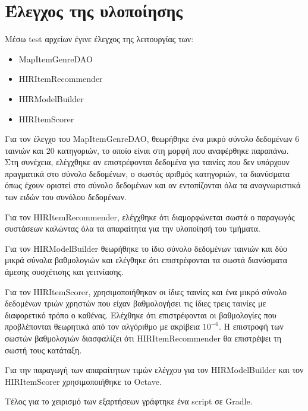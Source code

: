 \section{Έλεγχος της υλοποίησης}
Μέσω {\en test} αρχείων έγινε έλεγχος της λειτουργίας των:
\begin{itemize}
\item {\en MapItemGenreDAO}
\item {\en HIRItemRecommender}
\item {\en HIRModelBuilder}
\item {\en HIRItemScorer}
\end{itemize}\par
Για τον έλεγχο του {\en MapItemGenreDAO}, θεωρήθηκε ένα μικρό σύνολο δεδομένων 6 ταινιών και 20 κατηγοριών, το οποίο είναι στη μορφή που αναφέρθηκε παραπάνω. Στη συνέχεια, ελέγχθηκε αν επιστρέφονται δεδομένα για ταινίες που δεν υπάρχουν πραγματικά στο σύνολο δεδομένων, ο σωστός αριθμός κατηγοριών, τα διανύσματα όπως έχουν οριστεί στο σύνολο δεδομένων και αν εντοπίζονται όλα τα αναγνωριστικά των ειδών του συνόλου δεδομένων. \par
Για τον {\en HIRItemRecommender}, ελέγχθηκε ότι διαμορφώνεται σωστά ο παραγωγός συστάσεων καλώντας όλα τα απαραίτητα για την υλοποίησή του τμήματα.\par
Για τον {\en HIRModelBuilder} θεωρήθηκε το ίδιο σύνολο δεδομένων ταινιών και δύο μικρά σύνολα βαθμολογιών και ελέγθηκε ότι επιστρέφονται τα σωστά διανύσματα άμεσης συσχέτισης και γειτνίασης. \par
Για τον {\en HIRItemScorer}, χρησιμοποιήθηκαν οι ίδιες ταινίες και ένα μικρό σύνολο δεδομένων τριών χρηστών που είχαν βαθμολογήσει τις ίδιες τρεις ταινίες με διαφορετικό τρόπο ο καθένας. Ελέχθηκε ότι επιστρέφονται οι βαθμολογίες που προβλέπονται θεωρητικά από τον αλγόριθμο με ακρίβεια $10^{-6}$. Η επιστροφή των σωστών βαθμολογιών διασφαλίζει ότι {\en HIRItemRecommender} θα επιστρέψει τη σωστή τους κατάταξη. \par
Για την παραγωγή των απαραίτητων τιμών ελέγχου για τον {\en HIRModelBuilder} και τον {\en HIRItemScorer} χρησιμοποιήθηκε το {\en Octave}.\par
Τέλος για το χειρισμό των εξαρτήσεων γράφτηκε ένα {\en script} σε {\en Gradle}.
